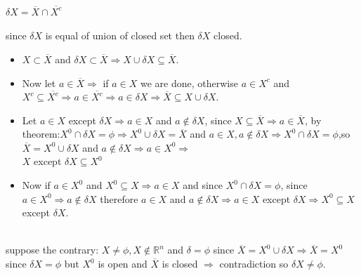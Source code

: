 \documentclass{amsbook}
\begin{document}
\begin{tcolorbox}[enhanced,attach boxed title to top center={yshift=-3mm,yshifttext=-1mm},
  colback=blue!5!white,colframe=blue!75!black,colbacktitle=red!80!black,
  title={Exercise 39.12:},fonttitle=\bfseries,
  boxed title style={size=small,colframe=red!50!black} ]
   {\color{red}{Proof:}}  
$\delta X=\overline{X}\cap\overline{X^c}$\\

{\color{red}{(a)-$\delta X $ is closed}}\\
since $\delta X$ is equal of union of closed set then $\delta X$ closed.\\

{}
\begin{itemize}
    \item $X\subset\overline{X}$ and $\delta X\subset \overline{X}\Rightarrow X\cup \delta X\subseteq 
    \overline{X}$.
    \item Now let $a\in \overline{X}\Rightarrow $ if $a\in X$ we are done, otherwise $a\in X^c$ and 
    $X^c\subseteq \overline{X^c}\Rightarrow a\in
\overline{X^c}\Rightarrow a\in \delta X\Rightarrow \overline{X}\subseteq X\cup\delta X$.
\end{itemize}
{\color{red}{(c)-$X$ except $\delta X=X^0$}}
\begin{itemize}
    \item Let $a\in X$ except $\delta X\Rightarrow a\in X$ and $a\notin \delta X$, since 
    $X\subseteq\overline{X}\Rightarrow a\in\overline{X}$, by theorem:$\boxed{X^0\cap\delta X=\phi\Rightarrow 
    X^0\cup\delta X=\overline{X}}$ and $a\in X,a\notin\delta X\Rightarrow X^0\cap\delta X=\phi$,so 
    $\overline{X}=X^0\cup\delta X$ and $a\notin\delta X\Rightarrow a\in X^0\Rightarrow$\\
    $X$ except $\delta X\subseteq X^0$ 
    \item Now if $a\in X^0$ and $X^0\subseteq X\Rightarrow a\in X$ and since 
    $X^0\cap \delta X=\phi$, since $a\in X^0\Rightarrow a\notin \delta
    X$ therefore $a\in X$ and $a\notin\delta X\Rightarrow a\in X$ except $\delta X\Rightarrow X^0\subseteq X$ 
    except $\delta X$. 
\end{itemize}

{}\\
suppose the contrary: $X\neq\phi, X\notin \mathbb{R}^n$ and $\delta=\phi$ since $\overline{X}=X^0\cup\delta 
X\Rightarrow
\overline{X}=X^0$ since $\delta X=\phi$ but $X^0$ is open and $\overline{X}$ is closed $\Rightarrow$ 
contradiction so $\delta X\neq\phi$.
  
\end{tcolorbox}
\end{document}
